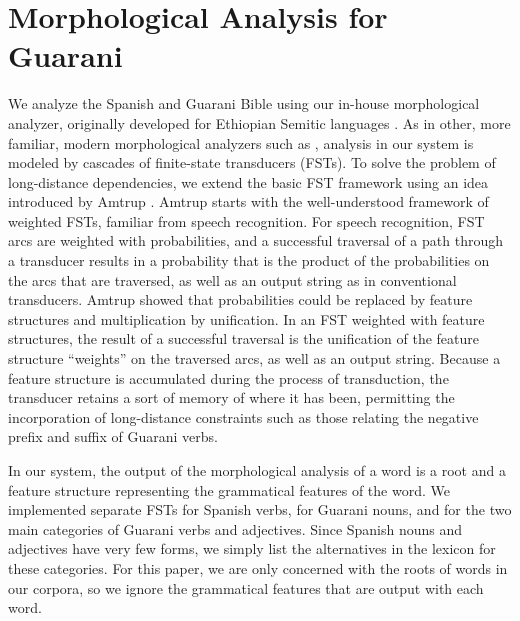 \section{Morphological Analysis for Guarani}
\label{sec:guaranima}
We analyze the Spanish and Guarani Bible using our in-house morphological
analyzer, originally developed for Ethiopian Semitic languages 
\cite{gasser:eacl09}.
As in other, more familiar, modern
morphological analyzers such as \cite{beesley+karttunen}, analysis in our
system is modeled by cascades of finite-state transducers (FSTs).  To solve the
problem of long-distance dependencies, we extend the basic FST framework using
an idea introduced by Amtrup \cite{amtrup:03}.  Amtrup starts with the
well-understood framework of weighted FSTs, familiar from speech recognition.
For speech recognition, FST arcs are weighted with probabilities, and a
successful traversal of a path through a transducer results in a probability
that is the product of the probabilities on the arcs that are traversed, as
well as an output string as in conventional transducers.  Amtrup showed that
probabilities could be replaced by feature structures and multiplication by
unification.  In an FST weighted with feature structures, the result of a
successful traversal is the unification of the feature structure ``weights'' on
the traversed arcs, as well as an output string.  Because a feature structure
is accumulated during the process of transduction, the transducer retains a
sort of memory of where it has been, permitting the incorporation of
long-distance constraints such as those relating the negative prefix and suffix
of Guarani verbs.

In our system, the output of the morphological analysis of a word is a root and
a feature structure representing the grammatical features of the word.  We
implemented separate FSTs for Spanish verbs, for Guarani nouns, and for the two
main categories of Guarani verbs and adjectives.  Since Spanish nouns and
adjectives have very few forms, we simply list the alternatives in the lexicon
for these categories.  For this paper, we are only concerned with the roots of
words in our corpora, so we ignore the grammatical features that are output
with each word.
